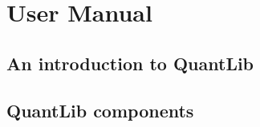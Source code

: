 
\hypertarget{usermanual}{}\part{User Manual}\label{usermanual}

\hypertarget{qlintro}{}\chapter{An introduction to QuantLib}\label{qlintro}










\hypertarget{frameworks}{}\chapter{QuantLib components}\label{components}





